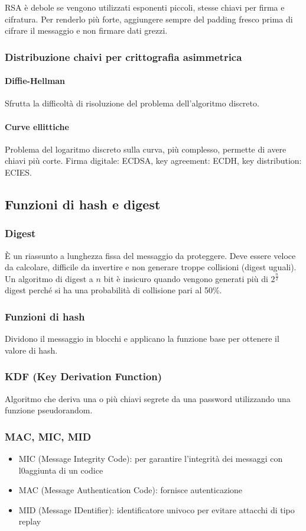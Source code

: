 \documentclass[11pt]{article}
\begin{document}
RSA è debole se vengono utilizzati esponenti piccoli, stesse chiavi per firma e cifratura. Per renderlo più forte, 
aggiungere sempre del padding fresco prima di cifrare il messaggio e non firmare dati grezzi.
\subsubsection{Distribuzione chaivi per crittografia asimmetrica}
\paragraph*{Diffie-Hellman}
Sfrutta la difficoltà di risoluzione del problema dell'algoritmo discreto. 
\paragraph*{Curve ellittiche}
Problema del logaritmo discreto sulla curva, più complesso, permette di avere chiavi più corte. Firma digitale: ECDSA, key
agreement: ECDH, key distribution: ECIES.
\subsection{Funzioni di hash e digest}
\subsubsection{Digest}
È un riassunto a lunghezza fissa del messaggio da proteggere. Deve essere veloce da calcolare, difficile da invertire e 
non generare troppe collisioni (digest uguali). Un algoritmo di digest a $n$ bit è insicuro quando vengono generati più 
di $2^{\frac{n}{2}}$ digest perché si ha una probabilità di collisione pari al 50\%.
\subsubsection{Funzioni di hash}
Dividono il messaggio in blocchi e applicano la funzione base per ottenere il valore di hash.
\subsubsection{KDF (Key Derivation Function)}
Algoritmo che deriva una o più chiavi segrete da una password utilizzando una funzione pseudorandom.
\subsubsection{MAC, MIC, MID}
\begin{itemize}
    \item MIC (Message Integrity Code): per garantire l'integrità dei messaggi con l0aggiunta di un codice
    \item MAC (Message Authentication Code): fornisce autenticazione
    \item MID (Message IDentifier): identificatore univoco per evitare attacchi di tipo replay
\end{itemize}
\end{document}
